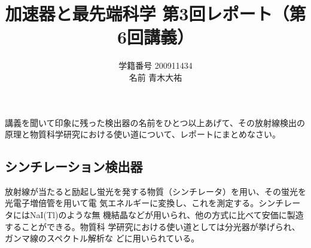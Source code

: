 \documentclass[a4j,9pt]{jsarticle}
\title{加速器と最先端科学 第3回レポート（第6回講義）}
\author{学籍番号 200911434 \\ 名前 青木大祐}
\begin{document}
\maketitle

\begin{screen}
講義を聞いて印象に残った検出器の名前をひとつ以上あげて、その放射線検出の
 原理と物質科学研究における使い道について、レポートにまとめなさい。
\end{screen}

\subsection*{シンチレーション検出器}
放射線が当たると励起し蛍光を発する物質（シンチレータ）を用い、その蛍光を光電子増倍管を用いて電
気エネルギーに変換し、これを測定する。シンチレータにはNaI(Tl)のような無
機結晶などが用いられ、他の方式に比べて安価に製造することができる。物質科
学研究における使い道としては分光器が挙げられ、ガンマ線のスペクトル解析な
どに用いられている。
\end{document}

